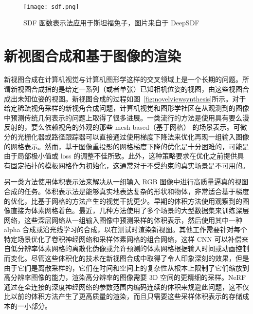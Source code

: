 \begin{figure}[t]
  \centering
  \texttt{[image: sdf.png]}
  \caption{SDF 函数表示法应用于斯坦福兔子，图片来自于 DeepSDF\cite{park2019deepsdf}}
  \label{fig:sdf}
\end{figure}

\section{新视图合成和基于图像的渲染}
新视图合成在计算机视觉与计算机图形学这样的交叉领域上是一个长期的问题。所谓新视图合成指的是给定一系列（或者单张）已知相机位姿的视图，由这些视图合成出未知位姿的视图。新视图合成的过程如图~\ref{fig:novelviewsynthesis}所示。对于给定稀疏视角采样的新视角合成问题，计算机视觉和图形学社区在从观测到的图像中预测传统几何表示的问题上取得了很多进展。一类流行的方法是使用具有要么漫反射\cite{Waechter2014Let}的，要么依赖视角\cite{debevec1996modeling, wood2000surface}的外观的那些 mesh-based（基于网格） 的场景表示。可微分的光栅化器\cite{loper2014opendr,chen2019learning,genova2018unsupervised,liu2019soft}或路径跟踪器\cite{li2018differentiable,nimier2019mitsuba}可以直接通过使用梯度下降法来优化再现一组输入图像的网格表示。然而，基于图像重投影的网格梯度下降的优化是十分困难的，可能是由于局部极小值或 loss 的调整不佳所致。此外，这种策略\cite{li2018differentiable}要求在优化之前提供具有固定拓扑的模板网格作为初始化，这通常对于不受约束的真实场景是不可用的。

另一类方法使用体积表示法来解决从一组输入 RGB 图像中进行高质量逼真的视图合成的任务。体积表示法是能够真实地表达复杂的形状和物体，非常适合基于梯度的优化，比基于网格的方法产生的视觉干扰更少。早期的体积方法\cite{kutulakos2000theory,szeliski1998stereo}使用观察到的图像直接为体素网格着色。最近，几种方法\cite{flynn2019deepview,mildenhall2019local,srinivasan2019pushing,zhou2018stereo}使用了多个场景的大型数据集来训练深层网络，这些深层网络从一组输入图像中预测采样的体积表示，然后使用其中一种 alpha 合成\cite{porter1984compositing}或沿光线学习的合成，以在测试时渲染新视图。其他工作需要针对每个特定场景优化了卷积神经网络和采样体素网格的组合网络，这样 CNN 可以补偿来自低分辨率体素网格\cite{sitzmann2019deepvoxels}的离散化伪像或允许预测的体素网格根据输入时间或动画控制而变化。尽管这些体积化的技术在新视图合成中取得了令人印象深刻的效果，但是由于它们是离散采样的，它们在时间和空间上的复杂性从根本上限制了它们缩放到高分辨率图像的能力，渲染高分辨率的图像需要 3D 空间的更精细的采样。NeRF 通过在全连接的深度神经网络的参数范围内编码连续的体积来规避此问题，这不仅比以前的体积方法产生了更高质量的渲染，而且只需要这些采样体积表示的存储成本的一小部分。

